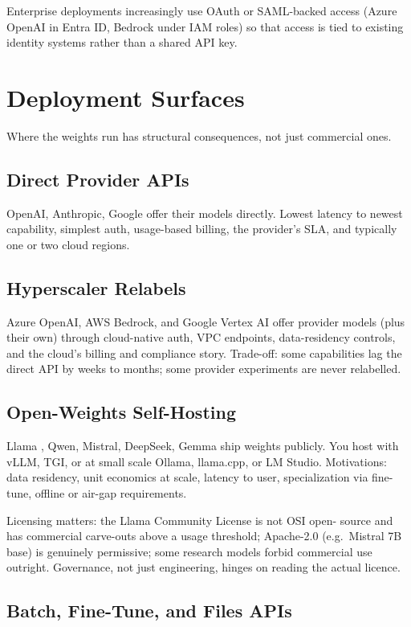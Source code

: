 Enterprise deployments increasingly use OAuth or SAML-backed
access (Azure OpenAI in Entra ID, Bedrock under IAM roles) so
that access is tied to existing identity systems rather than a
shared API key.

\section{Deployment Surfaces}

Where the weights run has structural consequences, not just
commercial ones.

\subsection{Direct Provider APIs}

OpenAI, Anthropic, Google offer their models directly. Lowest
latency to newest capability, simplest auth, usage-based billing,
the provider's SLA, and typically one or two cloud regions.

\subsection{Hyperscaler Relabels}

Azure OpenAI, AWS Bedrock, and Google Vertex AI offer provider
models (plus their own) through cloud-native auth, VPC
endpoints, data-residency controls, and the cloud's billing and
compliance story. Trade-off: some capabilities lag the direct
API by weeks to months; some provider experiments are never
relabelled.

\subsection{Open-Weights Self-Hosting}

Llama \citep{touvron2023llama2}, Qwen, Mistral, DeepSeek, Gemma
ship weights publicly. You host with vLLM, TGI, or at small scale
Ollama, llama.cpp, or LM Studio. Motivations: data residency,
unit economics at scale, latency to user, specialization via
fine-tune, offline or air-gap requirements.

Licensing matters: the Llama Community License is not OSI open-
source and has commercial carve-outs above a usage threshold;
Apache-2.0 (e.g.\ Mistral 7B base) is genuinely permissive; some
research models forbid commercial use outright. Governance, not
just engineering, hinges on reading the actual licence.

\subsection{Batch, Fine-Tune, and Files APIs}

